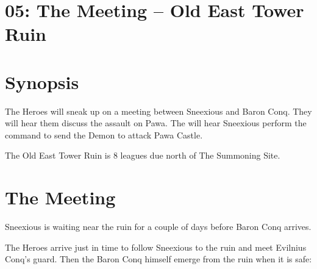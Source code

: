 \clearpage
{}
\section*{05: The Meeting -- Old East Tower Ruin}


\section*{Synopsis}
The Heroes will sneak up on a meeting between Sneexious and Baron Conq. They will hear them discuss the assault on Pawa. The will hear Sneexious perform the command to send the Demon to attack Pawa Castle.


The Old East Tower Ruin is 8 leagues due north of The Summoning Site.


\section*{The Meeting}
Sneexious is waiting near the ruin for a couple of days before Baron Conq arrives.

The Heroes arrive just in time to follow Sneexious to the ruin and meet Evilnius Conq's guard. Then the Baron Conq himself emerge from the ruin when it is safe:


